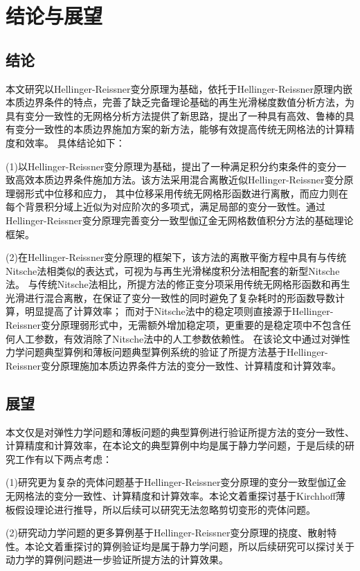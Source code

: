 \chapter{结论与展望}
\section{结论}
本文研究以Hellinger-Reissner变分原理为基础，依托于Hellinger-Reissner原理内嵌本质边界条件的特点，完善了缺乏完备理论基础的再生光滑梯度数值分析方法，为具有变分一致性的无网格分析方法提供了新思路，提出了一种具有高效、鲁棒的具有变分一致性的本质边界施加方案的新方法，能够有效提高传统无网格法的计算精度和效率。
具体结论如下：
\par
(1)以Hellinger-Reissner变分原理为基础，提出了一种满足积分约束条件的变分一致高效本质边界条件施加方法。该方法采用混合离散近似Hellinger-Reissner变分原理弱形式中位移和应力，
其中位移采用传统无网格形函数进行离散，而应力则在每个背景积分域上近似为对应阶次的多项式，满足局部的变分一致性。通过Hellinger-Reissner变分原理完善变分一致型伽辽金无网格数值积分方法的基础理论框架。
\par
(2)在Hellinger-Reissner变分原理的框架下，该方法的离散平衡方程中具有与传统Nitsche法相类似的表达式，可视为与再生光滑梯度积分法相配套的新型Nitsche法。
与传统Nitsche法相比，所提方法的修正变分项采用传统无网格形函数和再生光滑进行混合离散，在保证了变分一致性的同时避免了复杂耗时的形函数导数计算，明显提高了计算效率；
而对于Nitsche法中的稳定项则直接源于Hellinger-Reissner变分原理弱形式中，无需额外增加稳定项，更重要的是稳定项中不包含任何人工参数，有效消除了Nitsche法中的人工参数依赖性。
在该论文中通过对弹性力学问题典型算例和薄板问题典型算例系统的验证了所提方法基于Hellinger-Reissner变分原理施加本质边界条件方法的变分一致性、计算精度和计算效率。
\section{展望}
本文仅是对弹性力学问题和薄板问题的典型算例进行验证所提方法的变分一致性、计算精度和计算效率，在本论文的典型算例中均是属于静力学问题，于是后续的研究工作有以下两点考虑：\par
(1)研究更为复杂的壳体问题基于Hellinger-Reissner变分原理的变分一致型伽辽金无网格法的变分一致性、计算精度和计算效率。本论文着重探讨基于Kirchhoff薄板假设理论进行推导，所以后续可以研究无法忽略剪切变形的壳体问题。\par
(2)研究动力学问题的更多算例基于Hellinger-Reissner变分原理的挠度、散射特性。本论文着重探讨的算例验证均是属于静力学问题，所以后续研究可以探讨关于动力学的算例问题进一步验证所提方法的计算效果。

